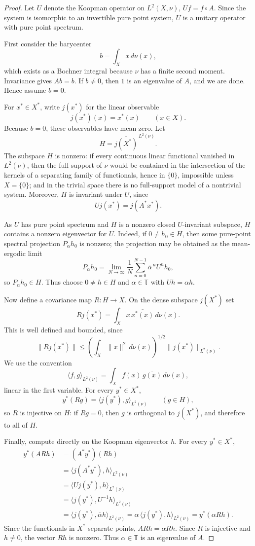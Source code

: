 \documentclass[11pt]{article}
\newcommand{\T}{\mathbb T}
\begin{document}
\begin{proof}
Let $U$ denote the Koopman operator on $L^2(X,\nu)$, $Uf=f\circ A$. Since the system is isomorphic to an invertible pure point system, $U$ is a unitary operator with pure point spectrum.

First consider the barycenter
\[
  b=\int_X x\,d\nu(x),
\]
which exists as a Bochner integral because $\nu$ has a finite second moment. Invariance gives $Ab=b$. If $b\neq 0$, then $1$ is an eigenvalue of $A$, and we are done. Hence assume $b=0$.

For $x^*\in X^*$, write $j(x^*)$ for the linear observable
\[
  j(x^*)(x)=x^*(x)\qquad (x\in X).
\]
Because $b=0$, these observables have mean zero. Let
\[
  H=\overline{j(X^*)}^{\,L^2(\nu)}.
\]
The subspace $H$ is nonzero: if every continuous linear functional vanished in $L^2(\nu)$, then the full support of $\nu$ would be contained in the intersection of the kernels of a separating family of functionals, hence in $\{0\}$, impossible unless $X=\{0\}$; and in the trivial space there is no full-support model of a nontrivial system. Moreover, $H$ is invariant under $U$, since
\[
  Uj(x^*)=j(A^*x^*).
\]

As $U$ has pure point spectrum and $H$ is a nonzero closed $U$-invariant subspace, $H$ contains a nonzero eigenvector for $U$. Indeed, if $0\neq h_0\in H$, then some pure-point spectral projection $P_\alpha h_0$ is nonzero; the projection may be obtained as the mean-ergodic limit
\[
  P_\alpha h_0=\lim_{N\to\infty}\frac1N\sum_{n=0}^{N-1}\overline{\alpha}^{\,n}U^n h_0,
\]
so $P_\alpha h_0\in H$. Thus choose $0\neq h\in H$ and $\alpha\in\T$ with $Uh=\alpha h$.

Now define a covariance map $R:H\to X$. On the dense subspace $j(X^*)$ set
\[
  Rj(x^*)=\int_X x\,\overline{x^*(x)}\,d\nu(x).
\]
This is well defined and bounded, since
\[
  \|Rj(x^*)\|
  \leq \left(\int_X \|x\|^2\,d\nu(x)\right)^{1/2}
       \|j(x^*)\|_{L^2(\nu)}.
\]
We use the convention
\[
  \langle f,g\rangle_{L^2(\nu)}=\int_X f(x)\,\overline{g(x)}\,d\nu(x),
\]
linear in the first variable. For every $y^*\in X^*$,
\[
  y^*(Rg)=\langle j(y^*),g\rangle_{L^2(\nu)}
  \qquad (g\in H),
\]
so $R$ is injective on $H$: if $Rg=0$, then $g$ is orthogonal to $j(X^*)$, and therefore to all of $H$.

Finally, compute directly on the Koopman eigenvector $h$. For every $y^*\in X^*$,
\[
\begin{aligned}
  y^*(ARh)
    &= (A^*y^*)(Rh) \\
    &= \langle j(A^*y^*),h\rangle_{L^2(\nu)} \\
    &= \langle Uj(y^*),h\rangle_{L^2(\nu)} \\
    &= \langle j(y^*),U^{-1}h\rangle_{L^2(\nu)} \\
    &= \langle j(y^*),\overline{\alpha}h\rangle_{L^2(\nu)}
     = \alpha\,\langle j(y^*),h\rangle_{L^2(\nu)}
     = y^*(\alpha Rh).
\end{aligned}
\]
Since the functionals in $X^*$ separate points, $ARh=\alpha Rh$. Since $R$ is injective and $h\neq 0$, the vector $Rh$ is nonzero. Thus $\alpha\in\T$ is an eigenvalue of $A$.
\end{proof}
\end{document}
